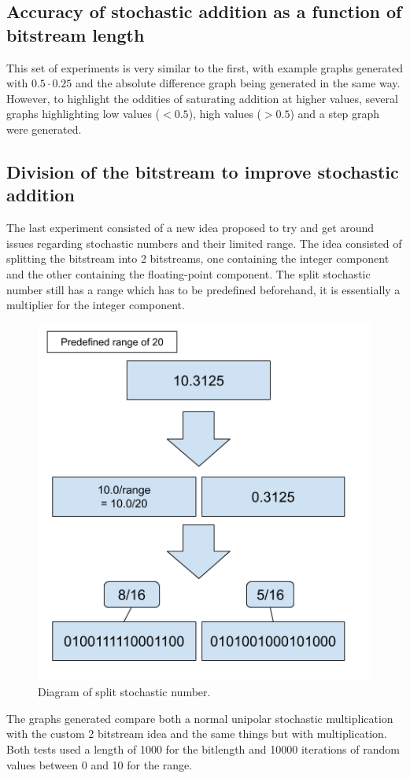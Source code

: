 \documentclass[a4paper,oneside,phd,etd]{BYUPhys}
\begin{document}
\subsection{Accuracy of stochastic addition as a function of bitstream length}
This set of experiments is very similar to the first, with example graphs generated with $0.5\cdot 0.25$ and the absolute difference graph being generated in the same way. However, to highlight the oddities of saturating addition at higher values, several graphs highlighting low values ($<0.5$), high values ($>0.5$) and a step graph were generated.

\subsection{Division of the bitstream to improve stochastic addition}
The last experiment consisted of a new idea proposed to try and get around issues regarding stochastic numbers and their limited range. The idea consisted of splitting the bitstream into 2 bitstreams, one containing the integer component and the other containing the floating-point component. The split stochastic number still has a range which has to be predefined beforehand, it is essentially a multiplier for the integer component.
\begin{figure}[H]
\centering
\includegraphics[scale=0.4]{pictures/Split-number.png}
\caption{Diagram of split stochastic number.}
\label{fig:split_stochastic}
\end{figure}
The graphs generated compare both a normal unipolar stochastic multiplication with the custom 2 bitstream idea and the same things but with multiplication. Both tests used a length of 1000 for the bitlength and 10000 iterations of random values between 0 and 10 for the range. 
\end{document}
